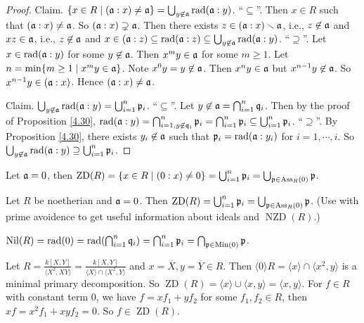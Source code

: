 \begin{proof}
    Claim. $\{x \in R \mid (\mathfrak{a}:x) \neq \mathfrak{a}\} = \bigcup_{y \not\in \mathfrak{a}} \operatorname{rad}(\mathfrak{a}:y)$. ``$\subseteq$''. Then $x \in R$ such that $(\mathfrak{a}:x) \neq \mathfrak{a}$. So $(\mathfrak{a}:x) \supsetneq \mathfrak{a}$. Then there exists $z \in (\mathfrak{a}:x) \smallsetminus \mathfrak{a}$, i.e., $z \not \in \mathfrak{a}$ and $xz \in \mathfrak{a}$, i.e., $z \not \in \mathfrak{a}$ and $x \in (\mathfrak{a}:z) \subseteq \operatorname{rad}(\mathfrak{a}:z) \subseteq \bigcup_{y \not\in \mathfrak{a}} \operatorname{rad}(\mathfrak{a}:y)$. ``$\supseteq$''. Let $x \in \operatorname{rad}(\mathfrak{a}:y)$ for some $y \not\in \mathfrak{a}$. Then $x^{m}y \in \mathfrak{a}$ for some $m \geq 1$. Let $n = \min\{m \geq 1 \mid x^{m}y \in \mathfrak{a}\}$. Note $x^{0}y = y \not \in \mathfrak{a}$. Then $x^{n}y \in \mathfrak{a}$ but $x^{n-1}y \not \in \mathfrak{a}$. So $x^{n-1}y \in (\mathfrak{a}:x)$. Hence $(\mathfrak{a}:x) \neq \mathfrak{a}$. \par
    Claim. $\bigcup_{y \not\in \mathfrak{a}} \operatorname{rad}(\mathfrak{a}:y) = \bigcup_{i=1}^{n}\mathfrak{p}_i$. ``$\subseteq$''. Let $y \not\in \mathfrak{a} = \bigcap_{i=1}^{n} \mathfrak{q}_i$. Then by the proof of Proposition \ref{4.30}, $\operatorname{rad}(\mathfrak{a}:y) = \bigcap_{i=1,y \not \in \mathfrak{q}_i}^{n} \mathfrak{p}_i = \bigcap_{i=1}^{n} \mathfrak{p}_i \subseteq \bigcup_{i=1}^{n}\mathfrak{p}_i$. ``$\supseteq$''. By Proposition \ref{4.30}, there exists $y_i \not \in \mathfrak{a}$ such that $\mathfrak{p}_i = \operatorname{rad}(\mathfrak{a}:y_i)$ for $i = 1,\cdots,i$. So $\bigcup_{y \not\in \mathfrak{a}} \operatorname{rad}(\mathfrak{a}:y) \supseteq \bigcup_{i=1}^{n} \mathfrak{p}_i$. 
\end{proof}

\begin{corollary}\label{4.34}
    Let $\mathfrak{a} = 0$, then $\operatorname{ZD}(R) = \{x \in R \mid (0:x) \neq 0\} = \bigcup_{i=1}^{n} \mathfrak{p}_i = \bigcup_{\mathfrak{p} \in \operatorname{Ass}_R(0)}\mathfrak{p}$.
\end{corollary}

\begin{summary}\label{4.35}
    Let $R$ be noetherian and $\mathfrak{a} = 0$. Then $\operatorname{ZD}(R) = \bigcup_{i=1}^{n} \mathfrak{p}_i = \bigcup_{\mathfrak{p} \in \operatorname{Ass}_R(0)}\mathfrak{p}$. (Use with prime avoidence to get useful information about ideals and $\operatorname{NZD}(R)$.) \par 
    $\operatorname{Nil}(R) = \operatorname{rad}(0) = \operatorname{rad}(\bigcap_{i=1}^{n}\mathfrak{q}_i) = \bigcap_{i=1}^{n} \mathfrak{p}_i = \bigcap_{\mathfrak{p} \in \operatorname{Min}(0)} \mathfrak{p}$.
\end{summary}

\begin{example*}
    Let $R = \frac{k[X,Y]}{\langle X^{2},XY \rangle} = \frac{k[X,Y]}{\langle X \rangle \cap \langle X^{2},Y \rangle}$ and $x = \overbar{X}, y= \overbar{Y} \in R$. Then $\langle 0 \rangle R = \langle x \rangle \cap \langle x^{2}, y \rangle$ is a minimal primary decomposition. So $\operatorname{ZD}(R) = \langle x \rangle \cup \langle x, y \rangle = \langle x, y \rangle$. For $f \in R$ with constant term 0, we have $f = xf_1 + yf_2$ for some $f_1,f_2 \in R$, then $xf = x^{2}f_1 + xyf_2 = 0$. So $f \in \operatorname{ZD}(R)$.
\end{example*}

